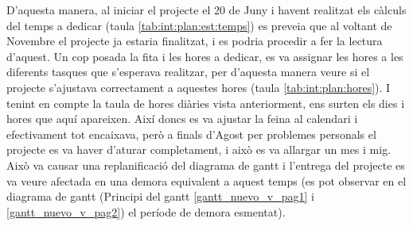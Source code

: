 D'aquesta manera, al iniciar el projecte el 20 de Juny i havent realitzat els càlculs del temps a dedicar (taula \ref{tab:int:plan:est:temps}) es preveia que al voltant de Novembre el projecte ja estaria finalitzat, i es podria procedir a fer la lectura d'aquest. 
Un cop posada la fita i les hores a dedicar, es va assignar les hores a les diferents tasques que s'esperava realitzar, per d'aquesta manera veure si el projecte s'ajustava correctament a aquestes hores (taula \ref{tab:int:plan:hores}). I tenint en compte la taula de hores diàries vista anteriorment, ens surten els dies i hores que aquí apareixen.
Així doncs es va ajustar la feina al calendari i efectivament tot encaixava, però a finals d'Agost per problemes personals el projecte es va haver d'aturar completament, i això es va allargar un mes i mig. Això va causar una replanificació del diagrama de gantt i l'entrega del projecte es va veure afectada en una demora equivalent a aquest temps (es pot observar en el diagrama de gantt (Principi del gantt \ref{gantt_nuevo_v_pag1} i \ref{gantt_nuevo_v_pag2}) el període de demora esmentat).


